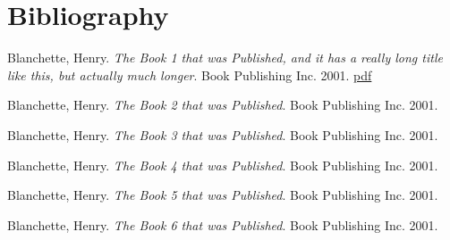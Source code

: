 \documentclass{article}
\begin{document}
\section*{Bibliography}


\noindent  Blanchette, Henry. \textit{The Book 1 that was Published, and it has a really long title like this, but actually much longer}. Book Publishing Inc. 2001. \href{www.google.com}{pdf}



\noindent  Blanchette, Henry. \textit{The Book 2 that was Published}. Book Publishing Inc. 2001. 



\noindent  Blanchette, Henry. \textit{The Book 3 that was Published}. Book Publishing Inc. 2001. 



\noindent  Blanchette, Henry. \textit{The Book 4 that was Published}. Book Publishing Inc. 2001. 



\noindent  Blanchette, Henry. \textit{The Book 5 that was Published}. Book Publishing Inc. 2001. 



\noindent  Blanchette, Henry. \textit{The Book 6 that was Published}. Book Publishing Inc. 2001. 
\end{document}
